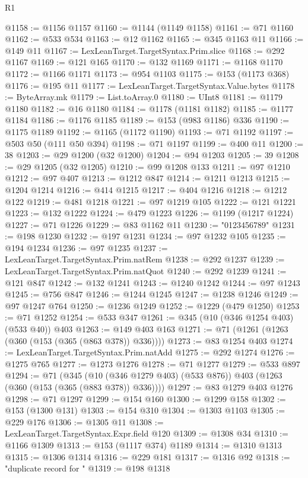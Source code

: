 \begin{lexlean}{R1}
\begin{coremodule}
@1158 := @1156 @1157
@1160 := @1144 (@1149 @1158)
@1161 := @71 @1160
@1162 := @533 @534
@1163 := @12 @1162
@1165 := @345 @1163 @11
@1166 := @149 @11
@1167 := LexLeanTarget.TargetSyntax.Prim.slice
@1168 := @292 @1167
@1169 := @121 @165
@1170 := @132 @1169
@1171 := @1168 @1170
@1172 := @1166 @1171
@1173 := @954 @1103
@1175 := @153 (@1173 @368)
@1176 := @195 @11
@1177 := LexLeanTarget.TargetSyntax.Value.bytes
@1178 := ByteArray.mk
@1179 := List.toArray.{0}
@1180 := UInt8
@1181 := @1179 @1180
@1182 := @16 @1180
@1184 := @1178 (@1181 @1182)
@1185 := @1177 @1184
@1186 := @1176 @1185
@1189 := @153 (@983 @1186) @336
@1190 := @1175 @1189
@1192 := @1165 (@1172 @1190)
@1193 := @71 @1192
@1197 := @503 @50 (@111 @50 @394)
@1198 := @71 @1197
@1199 := @400 @11
@1200 := 38
@1203 := @29 @1200 (@32 @1200)
@1204 := @94 @1203
@1205 := 39
@1208 := @29 @1205 (@32 @1205)
@1210 := @99 @1208 @133
@1211 := @97 @1210
@1212 := @97 @407
@1213 := @1212 @847
@1214 := @1211 @1213
@1215 := @1204 @1214
@1216 := @414 @1215
@1217 := @404 @1216
@1218 := @1212 @122
@1219 := @481 @1218
@1221 := @97 @1219 @105
@1222 := @121 @1221
@1223 := @132 @1222
@1224 := @479 @1223
@1226 := @1199 (@1217 @1224)
@1227 := @71 @1226
@1229 := @83 @1162 @11
@1230 := "0123456789"
@1231 := @198 @1230
@1232 := @197 @1231
@1234 := @97 @1232 @105
@1235 := @194 @1234
@1236 := @97 @1235
@1237 := LexLeanTarget.TargetSyntax.Prim.natRem
@1238 := @292 @1237
@1239 := LexLeanTarget.TargetSyntax.Prim.natQuot
@1240 := @292 @1239
@1241 := @121 @847
@1242 := @132 @1241
@1243 := @1240 @1242
@1244 := @97 @1243
@1245 := @756 @847
@1246 := @1244 @1245
@1247 := @1238 @1246
@1249 := @97 @1247 @764
@1250 := @1236 @1249
@1252 := @1229 (@479 @1250)
@1253 := @71 @1252
@1254 := @533 @347
@1261 := @345 (@10 (@346 @1254 @403) (@533 @40)) @403
@1263 := @149 @403 @163
@1271 := @71 (@1261 (@1263 (@360 (@153 (@365 (@863 @378)) @336))))
@1273 := @83 @1254 @403
@1274 := LexLeanTarget.TargetSyntax.Prim.natAdd
@1275 := @292 @1274
@1276 := @1275 @765
@1277 := @1273 @1276
@1278 := @71 @1277
@1279 := @533 @897
@1294 := @71
    (@345 (@10 (@346 @1279 @403) (@533 @876)) @403 (@1263 (@360 (@153 (@365 (@883 @378)) @336))))
@1297 := @83 @1279 @403 @1276
@1298 := @71 @1297
@1299 := @154 @160
@1300 := @1299 @158
@1302 := @153 (@1300 @131)
@1303 := @154 @310
@1304 := @1303 @1103
@1305 := @229 @176
@1306 := @1305 @11
@1308 := LexLeanTarget.TargetSyntax.Expr.field @120
@1309 := @1308 @34
@1310 := @1166 @1309
@1313 := @153 (@1117 @374) @1189
@1314 := @1310 @1313
@1315 := @1306 @1314
@1316 := @229 @181
@1317 := @1316 @92
@1318 := "duplicate record for "
@1319 := @198 @1318

\end{coremodule}
\end{lexlean}

